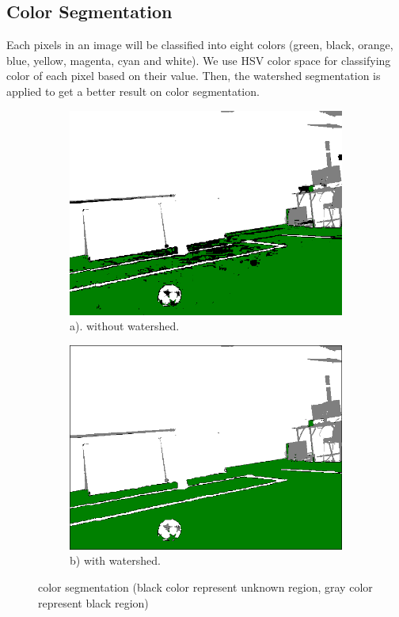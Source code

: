 	\subsection{Color Segmentation}
	\label{colorSeg}
	Each pixels in an image will be classified into eight colors (green, black, orange, blue, yellow, magenta, cyan and white). We use HSV color space for classifying color of each pixel based on their value. Then, the watershed segmentation is applied to get a better result on color segmentation.
	\begin{figure}[H]
		\begin{subfigure}{.5\textwidth}
			\centering
			\includegraphics[width=\textwidth]{image/colormap.png}
			\caption{a). without watershed.}
			\label{fig:sfig1}
		\end{subfigure}%
		\begin{subfigure}{.5\textwidth}
			\centering
			\includegraphics[width=\textwidth]{image/colormap_watershed.png}
			\caption{b) with watershed.}
			\label{fig:sfig2}
		\end{subfigure}
		\caption{color segmentation (black color represent unknown region, gray color represent black region)}
		\label{fig:fig}
	\end{figure}
	
